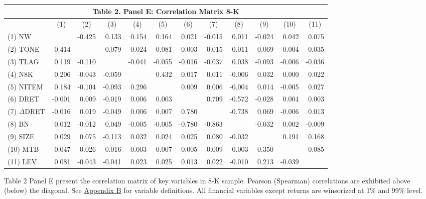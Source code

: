 \begin{table}[H] \label{T2PE}
  \begin{center}
  	\begin{tabular}{lrrrrrrrrrrr}
  		\multicolumn{12}{c}{\textbf{Table 2. Panel E: Correlation Matrix 8-K}} \\
  		\midrule
  		\midrule
  		& \multicolumn{1}{c}{(1)} & \multicolumn{1}{c}{(2)} & \multicolumn{1}{c}{(3)} & \multicolumn{1}{c}{(4)} & \multicolumn{1}{c}{(5)} & \multicolumn{1}{c}{(6)} & \multicolumn{1}{c}{(7)} & \multicolumn{1}{c}{(8)} & \multicolumn{1}{c}{(9)} & \multicolumn{1}{c}{(10)} & \multicolumn{1}{c}{(11)} \\
  		\midrule
  		(1) NW & & -0.425 & 0.133 & 0.154 & 0.164 & 0.021 & -0.015 & 0.011 & -0.024 & 0.042 & 0.075 \\
  		(2) TONE & -0.414 &   & -0.079 & -0.024 & -0.081 & 0.003 & 0.015 & -0.011 & 0.069 & 0.004 & -0.035 \\
  		(3) TLAG & 0.119 & -0.110 &   & -0.041 & -0.055 & -0.016 & -0.037 & 0.038 & -0.093 & -0.006 & -0.036 \\
  		(4) N8K & 0.206 & -0.043 & -0.059 &   & 0.432 & 0.017 & 0.011 & -0.006 & 0.032 & 0.000 & 0.022 \\
  		(5) NITEM & 0.184 & -0.104 & -0.093 & 0.296 &   & 0.009 & 0.006 & -0.004 & 0.014 & -0.005 & 0.027 \\
  		(6) DRET & -0.001 & 0.009 & -0.019 & 0.006 & 0.003 &   & 0.709 & -0.572 & -0.028 & 0.004 & 0.003 \\
  		(7) $\Delta$DRET & -0.016 & 0.019 & -0.049 & 0.006 & 0.007 & 0.780 &   & -0.738 & 0.069 & -0.006 & 0.013 \\
  		(8) BN & 0.012 & -0.012 & 0.049 & -0.005 & -0.005 & -0.780 & -0.863 &   & -0.032 & 0.002 & -0.009 \\
  		(9) SIZE & 0.029 & 0.075 & -0.113 & 0.032 & 0.024 & 0.025 & 0.080 & -0.032 &   & 0.191 & 0.168 \\
  		(10) MTB & 0.047 & 0.026 & -0.016 & 0.003 & -0.007 & 0.005 & 0.009 & -0.003 & 0.350 &   & 0.085 \\
  		(11) LEV & 0.081 & -0.043 & -0.041 & 0.023 & 0.025 & 0.013 & 0.022 & -0.010 & 0.213 & -0.039 &  \\
  		\bottomrule
  		\bottomrule
  	\end{tabular}%
  \end{center}
	\begin{footnotesize}
		\noindent Table 2 Panel E present the correlation matrix of key variables in 8-K sample. Pearson (Spearman) correlations are exhibited above (below) the diagonal. See \hyperref[appb]{Appendix B} for variable definitions. All financial variables except returns are winsorized at 1\% and 99\% level. 
	\end{footnotesize}
\end{table}%
